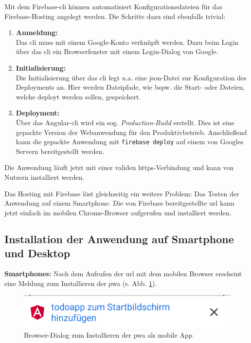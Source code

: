 Mit dem Firebase-\ac{cli} können automatisiert Konfigurationsdateien für das Firebase-Hosting angelegt werden. Die Schritte dazu sind ebenfalls trivial:
\begin{enumerate}
	\item \textbf{Anmeldung: \\}
	      Das \ac{cli} muss mit einem Google-Konto verknüpft werden. Dazu beim Login über das \ac{cli} ein Browserfenster mit einem Login-Dialog von Google.
	\item \textbf{Initialisierung: \\}
	      Die Initialisierung über das \ac{cli} legt u.a. eine \ac{json}-Datei zur Konfiguration des Deployments an. Hier werden Dateipfade, wie bspw. die Start- oder Dateien, welche deployt werden sollen, gespeichert.
	\item \textbf{Deployment: \\}
	      Über das Angular-\ac{cli} wird ein sog. \textit{Production-Build} erstellt. Dies ist eine gepackte Version der Webanwendung für den Produktivbetrieb.
	      Anschließend kann die gepackte Anwendung mit \texttt{firebase deploy} auf einem von Googles Servern bereitgestellt werden.
\end{enumerate}

Die Anwendung läuft jetzt mit einer validen \ac{https}-Verbindung und kann von Nutzern installiert werden.

Das Hosting mit Firebase löst gleichzeitig ein weitere Problem: Das Testen der Anwendung auf einem Smartphone. Die von Firebase bereitgestellte \ac{url} kann jetzt einfach im mobilen Chrome-Browser aufgerufen und installiert werden.

\subsection{Installation der Anwendung auf Smartphone und Desktop}
\textbf{Smartphones:}
Nach dem Aufrufen der \ac{url} mit dem mobilen Browser erscheint eine Meldung zum Installieren der \ac{pwa} (s. Abb. \ref{fig:dialog_install_pwa_mobile}).

\begin{figure}[h!]
	\includegraphics[scale=0.5]{img/pwa_add_to_homescreen.png}
	\centering
	\caption{Browser-Dialog zum Installieren der \ac{pwa} als mobile App}
	\label{fig:dialog_install_pwa_mobile}
\end{figure}


